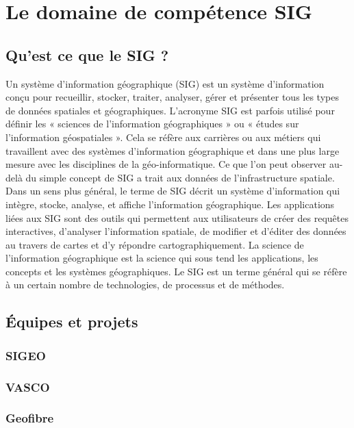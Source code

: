\chapter{Le domaine de compétence SIG}
\section{Qu'est ce que le SIG ?}
Un système d'information géographique (SIG) est un système d'information conçu pour recueillir, stocker, traiter, analyser, gérer et présenter tous les types de données spatiales et géographiques. L’acronyme SIG est parfois utilisé pour définir les « sciences de l’information géographiques » ou « études sur l’information géospatiales ». Cela se réfère aux carrières ou aux métiers qui travaillent avec des systèmes d’information géographique et dans une plus large mesure avec les disciplines de la géo-informatique. Ce que l’on peut observer au-delà du simple concept de SIG a trait aux données de l’infrastructure spatiale.
Dans un sens plus général, le terme de SIG décrit un système d’information qui intègre, stocke, analyse, et affiche l’information géographique. Les applications liées aux SIG sont des outils qui permettent aux utilisateurs de créer des requêtes interactives, d’analyser l’information spatiale, de modifier et d’éditer des données au travers de cartes et d’y répondre cartographiquement. La science de l’information géographique est la science qui sous tend les applications, les concepts et les systèmes géographiques.
Le SIG est un terme général qui se réfère à un certain nombre de technologies, de processus et de méthodes.
\section{\'Equipes et projets}
\subsection{SIGEO}
\subsection{VASCO}
\subsection{Geofibre}
